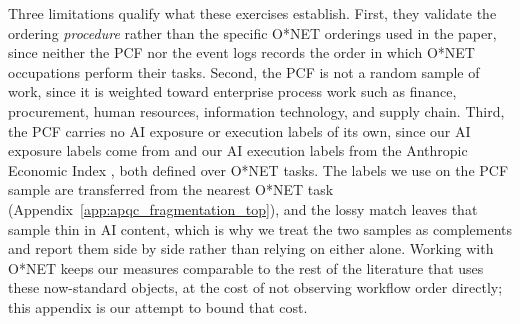 Three limitations qualify what these exercises establish.
First, they validate the ordering \emph{procedure} rather than the specific O*NET orderings used in the paper,
since neither the PCF nor the event logs records the order in which O*NET occupations perform their tasks.
Second, the PCF is not a random sample of work, since it is weighted toward enterprise process work such as finance,
procurement, human resources, information technology, and supply chain.
Third, the PCF carries no AI exposure or execution labels of its own, since our AI exposure labels
come from \citet{eloundou2023gpts} and our AI execution labels from the Anthropic Economic Index
\citep{handa2025economictasksperformedai}, both defined over O*NET tasks.
The labels we use on the PCF sample are transferred from the nearest O*NET task
(Appendix~\ref{app:apqc_fragmentation_top}), and the lossy match leaves that sample thin in AI content, which is why
we treat the two samples as complements and report them side by side rather than relying on either alone.
Working with O*NET keeps our measures comparable to the rest of the literature that uses these now-standard
objects, at the cost of not observing workflow order directly; this appendix is our attempt to bound that
cost.
